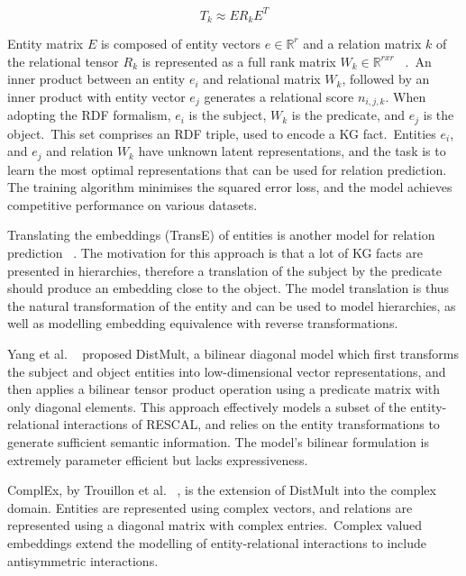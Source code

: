 \begin{equation}
	T_k \approx ER_kE^T
\end{equation}

\noindent Entity matrix $ E $ is composed of entity vectors $ e \in \mathbb{R}^r $ and a relation matrix $ k $ of the relational tensor $ R_k $ is represented as a full rank matrix $ W_k \in \mathbb{R}^{rxr} $ \unskip~\citep{nickel2012factorizing}.\ An inner product between an entity $ e_i $ and relational matrix $ W_k $, followed by an inner product with entity vector $ e_j $ generates a relational score $ n_{i,j,k} $. When adopting the RDF formalism, $ e_i $ is the subject, $ W_k $ is the predicate, and $ e_j $ is the object.\ This set comprises an RDF triple, used to encode a KG fact.\ Entities $ e_i $, and $ e_j $ and relation $ W_k $ have unknown latent representations, and the task is to learn the most optimal representations that can be used for relation prediction. The training algorithm minimises the squared error loss, and the model achieves competitive performance on various datasets. \par

\noindent Translating the embeddings (TransE) of entities is another model for relation prediction \unskip~\citep{bordes2013translating}. The motivation for this approach is that a lot of KG facts are presented in hierarchies, therefore a translation of the subject by the predicate should produce an embedding close to the object. The model translation is thus the natural transformation of the entity and can be used to model hierarchies, as well as modelling embedding equivalence with reverse transformations. \par

\noindent Yang et al. \unskip~\citep{yang2014embedding} proposed DistMult, a bilinear diagonal model which first transforms the subject and object entities into low-dimensional vector representations, and then applies a bilinear tensor product operation using a predicate matrix with only diagonal elements. This approach effectively models a subset of the entity-relational interactions of RESCAL, and relies on the entity transformations to generate sufficient semantic information. The model's bilinear formulation is extremely parameter efficient but lacks expressiveness. \par

\noindent ComplEx, by Trouillon et al. \unskip~\citep{trouillon2016complex}, is the extension of DistMult into the complex domain. Entities are represented using complex vectors, and relations are represented using a diagonal matrix with complex entries.\ Complex valued embeddings extend the modelling of entity-relational interactions to include antisymmetric interactions. \par

